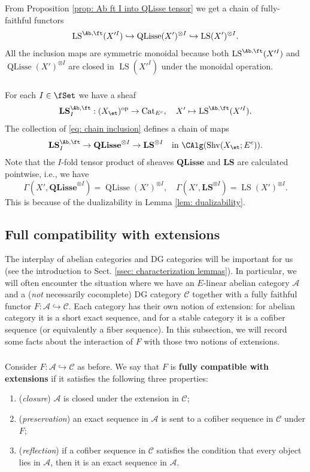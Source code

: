 \documentclass[10pt]{amsart}
\newcommand{\sssec}{\subsubsection}
\theoremstyle{remark}
\newcommand{\te}{\text}
\newcommand{\on}{\operatorname}
\newcommand{\cA}{\mathcal{A}}
\newcommand{\cC}{\mathcal{C}}
\newcommand{\Cat}{\on{Cat}}
\newcommand{\CatEc}{\Cat_{E^c}}
\newcommand{\Shv}{\on{Shv}}
\newcommand{\LS}{\on{LS}}
\newcommand{\QLisse}{\on{QLisse}}
\DeclareMathOperator{\op}{op}
\begin{document}
\sssec{}
From Proposition \ref{prop: Ab ft I into QLisse tensor} we get a chain of fully-faithful functors 
\begin{equation}\label{eq: chain inclusion}
    \LS^{\Ab,\ft}(X'^I)\hookrightarrow \QLisse(X')^{\otimes I}\hookrightarrow \LS(X')^{\otimes I}.
\end{equation}
All the inclusion maps are symmetric monoidal because both $\LS^{\Ab,\ft}(X'^I)$ and $\QLisse(X')^{\otimes I}$ are closed in $\LS(X'^I)$ under the monoidal operation. 


\sssec{}
For each $I\in\fSet$ we have a sheaf
\[\mathbf{LS}^{\Ab,\ft}_I:(X_{\et})^{\op}\rightarrow\CatEc,\quad X'\mapsto \LS^{\Ab,\ft}(X'^I).\]
The collection of \eqref{eq: chain inclusion} defines a chain of maps
\begin{equation}\label{eq: chain of sheaves}
    \textbf{LS}^{\Ab,\ft}_I\rightarrow\textbf{QLisse}^{\otimes I}\rightarrow\textbf{LS}^{\otimes I}\quad \te{in }\CAlg(\Shv(X_{\et};E^c)).
\end{equation}
Note that the $I$-fold tensor product of sheaves $\textbf{QLisse}$ and $\textbf{LS}$ are calculated pointwise, i.e., we have
\[\Gamma(X', \textbf{QLisse}^{\otimes I})=\QLisse(X')^{\otimes I},\quad \Gamma(X', \textbf{LS}^{\otimes I})=\LS(X')^{\otimes I}.\]
This is because of the dualizability in Lemma \ref{lem: dualizability}. 

\subsection{Full compatibility with extensions}\label{ssec: full compatibility with extensions}
The interplay of abelian categories and DG categories will be important for us (see the introduction to Sect. \ref{ssec: characterization lemmas}). In particular, we will often encounter the situation where we have an $E$-linear abelian category $\cA$ and a (\emph{not} necessarily cocomplete) DG category $\cC$ together with a fully faithful functor $F: \cA\hookrightarrow \cC$. Each category has their own notion of extension: for abelian category it is a short exact sequence, and for a stable category it is a cofiber sequence (or equivalently a fiber sequence). In this subsection, we will record some facts about the interaction of $F$ with those two notions of extensions.

\sssec{}
Consider $F:\cA\hookrightarrow \cC$ as before. We say that $F$ is \textbf{fully compatible with extensions} if it satisfies the following three properties:
\begin{enumerate}
    \item (\emph{closure}) $\cA$ is closed under the extension in $\cC$;
    \item (\emph{preservation}) an exact sequence in $\cA$ is sent to a cofiber sequence in $\cC$ under $F$;
    \item (\emph{reflection}) if a cofiber sequence in $\cC$ satisfies the condition that every object lies in $\cA$, then it is an exact sequence in $\cA$.
\end{enumerate}
\end{document}
